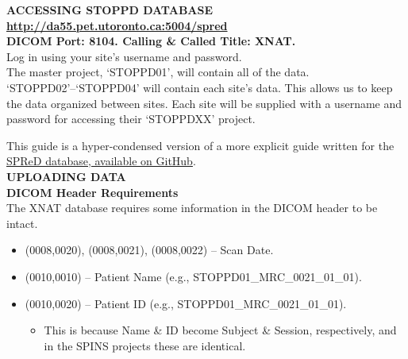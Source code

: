 \documentclass[a4paper,11pt,oneside]{book}
\newcommand\titlesL{%
    \noindent
    \small
    \leftskip=0in
    \textbf
}
\newcommand\stepsL{
    \noindent
    \leftskip=0.15in
    \small
}
\begin{document}
%
\vspace{0.1in}
\begin{multicols}{2}

%
\noindent\leftskip=0in\large\textbf{ACCESSING STOPPD DATABASE}\\

\titlesL{\url{http://da55.pet.utoronto.ca:5004/spred}} \\

\titlesL{DICOM Port: 8104. Calling \& Called Title: XNAT.} \\

\stepsL{Log in using your site's username and password.} \\

\stepsL{The master project, `STOPPD01', will contain all of the data. `STOPPD02'--`STOPPD04' will contain each site's data. This allows us to keep the data organized between sites. Each site will be supplied with a username and password for accessing their `STOPPDXX' project.} \\

\stepsL{This guide is a hyper-condensed version of a more explicit guide written for the \href{https://github.com/TIGRLab/SPINS/blob/master/docs/guides/spred-upload-tutorial-v1.5.pdf?raw=true}{SPReD database, available on GitHub}. \\

%
\noindent\leftskip=0in\large\textbf{UPLOADING DATA}\\

\titlesL{DICOM Header Requirements} \\

\stepsL{The XNAT database requires some information in the DICOM header to be intact.} \

\stepsL{\begin{itemize}  
            \item{(0008,0020), (0008,0021), (0008,0022) -- Scan Date.}  
            \item{(0010,0010) -- Patient Name (e.g., STOPPD01\_MRC\_0021\_01\_01).}  
            \item{(0010,0020) -- Patient ID (e.g., STOPPD01\_MRC\_0021\_01\_01).} 
            \begin{itemize}
                \item{This is because Name \& ID become Subject \& Session, respectively, and in the SPINS projects these are identical.}
            \end{itemize}
        \end{itemize}
        }

}
\end{multicols}
\end{document}
